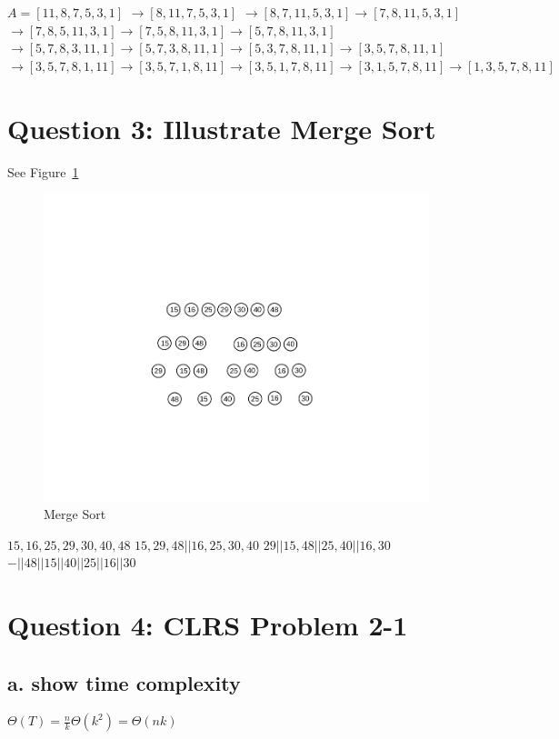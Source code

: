 \documentclass[]{article}
\begin{document}
\begin{codebox}
	\li $A = [11, 8, 7, 5, 3, 1] $
	\li $\rightarrow [8, 11, 7, 5, 3, 1]$
	\li $\rightarrow [8, 7, 11, 5, 3, 1] \rightarrow [7, 8, 11, 5, 3, 1]$
	\li $\rightarrow [7, 8, 5, 11, 3, 1] \rightarrow [7, 5, 8, 11, 3, 1] \rightarrow [5, 7, 8, 11, 3, 1]$
	\li $\rightarrow [5, 7, 8, 3, 11, 1] \rightarrow [5, 7, 3, 8, 11, 1] \rightarrow [5, 3, 7, 8, 11, 1] \rightarrow [3, 5, 7, 8, 11, 1]$
	\li $\rightarrow [3, 5, 7, 8, 1, 11] \rightarrow [3, 5, 7, 1, 8, 11] \rightarrow [3, 5, 1, 7, 8, 11] 
	\rightarrow [3, 1, 5, 7, 8, 11] \rightarrow [1, 3, 5, 7, 8, 11]$
\end{codebox}

\section{Question 3: Illustrate Merge Sort}

See Figure~\ref{fig:2ms}

\begin{figure}
	\centering
	\includegraphics[width=0.5\linewidth]{2_merge}
	\caption{Merge Sort}
	\label{fig:2ms}
\end{figure}

\begin{codebox}
	\li $15, 16, 25, 29, 30, 40, 48$
	\li $15, 29, 48 || 16, 25, 30, 40$
	\li $29 || 15, 48 || 25, 40 || 16, 30$
	\li $- || 48 || 15 || 40 || 25 || 16 || 30$
\end{codebox}

\section{Question 4: CLRS Problem 2-1}
\subsection{a. show time complexity}
$\Theta(T) = \frac{n}{k}\Theta(k^{2}) = \Theta(nk)$
\end{document}
